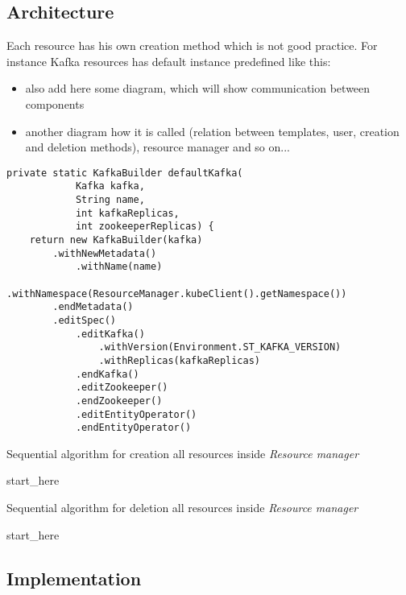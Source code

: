 

\subsection{Architecture}
\label{02d-strimzi-architecture}

Each resource has his own creation method which is not good practice. For instance Kafka resources has default instance predefined like this:

\begin{itemize}[itemsep=1mm, parsep=0pt]
    \item also add here some diagram, which will show communication between components
    \item another diagram how it is called (relation between templates, user, creation and deletion methods), resource manager and so on...
\end{itemize}

\begin{verbatim}
private static KafkaBuilder defaultKafka(
            Kafka kafka,
            String name,
            int kafkaReplicas,
            int zookeeperReplicas) {
    return new KafkaBuilder(kafka)
        .withNewMetadata()
            .withName(name)
            .withNamespace(ResourceManager.kubeClient().getNamespace())
        .endMetadata()
        .editSpec()
            .editKafka()
                .withVersion(Environment.ST_KAFKA_VERSION)
                .withReplicas(kafkaReplicas)
            .endKafka()
            .editZookeeper()
            .endZookeeper()
            .editEntityOperator()
            .endEntityOperator()
\end{verbatim}

\begin{algorithm}[H]
    \label{01:alg:dsds}
    \caption{Sequential algorithm for creation all resources inside \emph{Resource manager}}

    \begin{algorithmic}[1]
        \State start\_here
    \end{algorithmic}
\end{algorithm}


\begin{algorithm}[H]
    \label{01:alg:dsdsd+}
    \caption{Sequential algorithm for deletion all resources inside \emph{Resource manager}}

    \begin{algorithmic}[1]
        \State start\_here
    \end{algorithmic}
\end{algorithm}


\subsection*{Implementation}